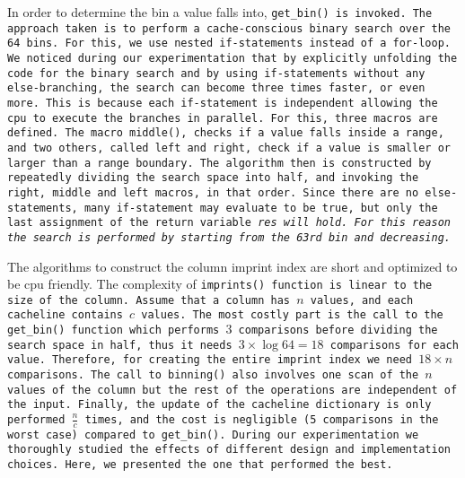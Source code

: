In order to determine the bin a value falls into, \tt{get\_bin()}
is invoked. %
The approach taken is to perform a cache-conscious binary search over the 64
bins. For this, we use nested if-statements instead of a for-loop. We noticed
during our experimentation that by explicitly unfolding the code for the
binary search and by using if-statements without any else-branching, the search
can become three times faster, or even more. This is because each if-statement
is independent allowing the cpu to execute the branches in parallel. For this,
three macros are defined. The macro \tt{middle()}, checks if a value falls
inside a range, and two others, called \tt{left} and \tt{right}, check if a
value is smaller or larger than a range boundary. The algorithm then is
constructed by repeatedly dividing the search space into half, and invoking the
\tt{right}, \tt{middle} and \tt{left} macros, in that order. Since
there are no else-statements, many if-statement may evaluate to
be true, but only the last assignment of the return variable \it{res} will
hold. For this reason the search is performed by starting from the 63rd bin
and decreasing.

%
The algorithms to construct the column imprint index are short and optimized to
be cpu friendly. The complexity of \tt{imprints()} function is linear to the
size of the column. Assume that a column has $n$ values, and each cacheline
contains $c$ values. The most costly part is the call to the \tt{get\_bin()}
function which performs $3$ comparisons before dividing the search space in
half, thus it needs $3\times\log{64}=18$ comparisons for each
value. Therefore, for creating the entire imprint index we need $18\times n$
comparisons. The call to \tt{binning()} also involves one scan of the $n$
values of the column but the rest of the operations are independent of the
input. Finally, the update of the cacheline dictionary is only performed
$\frac{n}{c}$ times, and the cost is negligible (5 comparisons in the worst
case) compared to \tt{get\_bin()}. During our experimentation we thoroughly
studied the effects of different design and implementation choices. Here, we
presented the one that performed the best.

